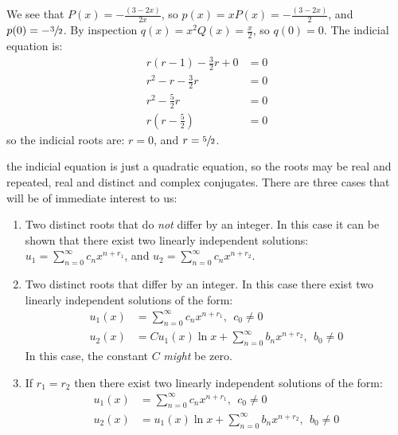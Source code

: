 \vspace{0.25cm}

\noindent We see that $P(x) = -\frac{(3 - 2x)}{2x}$, so $p(x) = xP(x) = -\frac{(3-2x)}{2}$, and $p(0) = -\sfrac{3}{2}$.  By inspection $q(x) = x^2Q(x) = \frac{x}{2}$, so $q(0) = 0$.  The indicial equation is:
\begin{align*}
r(r-1)-\frac{3}{2}r + 0 &= 0 \\
r^2-r - \frac{3}{2}r &= 0 \\
r^2 - \frac{5}{2}r &= 0 \\
r\left(r-\frac{5}{2}\right) &= 0
\end{align*}
so the indicial roots are: $r = 0$, and $r = \sfrac{5}{2}$.


 the indicial equation is just a quadratic equation, so the roots may be real and repeated, real and distinct and complex conjugates.  There are three cases that will be of immediate interest to us:
\begin{enumerate}
\item Two distinct roots that do \emph{not} differ by an integer.  In this case it can be shown that there exist two linearly independent solutions: $u_1 = \sum_{n=0}^{\infty}c_nx^{n+r_1}$, and $u_2 = \sum_{n=0}^{\infty}c_nx^{n+r_2}$.
\item Two distinct roots that differ by an integer.  In this case there exist two linearly independent solutions of the form:
\begin{align*}
u_1(x) &= \sum\limits_{n=0}^{\infty}c_nx^{n+r_1}, \ \ c_0 \ne 0 \\
u_2(x) &= C u_1(x) \ln{x} + \sum\limits_{n=0}^{\infty}b_nx^{n+r_2}, \ \ b_0 \ne 0 
\end{align*}
In this case, the constant $C$ \emph{might} be zero.
\item If $r_1 = r_2$ then there exist two linearly independent solutions of the form:
\begin{align*}
u_1(x) &= \sum\limits_{n=0}^{\infty}c_nx^{n+r_1}, \ \ c_0 \ne 0 \\
u_2(x) &= u_1(x) \ln{x} + \sum\limits_{n=0}^{\infty}b_nx^{n+r_2}, \ \ b_0 \ne 0
\end{align*}
\end{enumerate}

